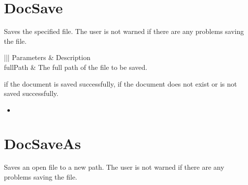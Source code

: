 \documentclass[letterpaper,12pt,english,openany,oneside]{sphinxmanual}
\begin{document}
\section{DocSave}
\label{\detokenize{IAC_API_DDE_Messages:id31}}
Saves the specified file. The user is not warned if there are any problems saving the file.


\begin{sphinxVerbatim}[commandchars=\\\{\}]
\PYG{p}{[} \PYG{p}{]}
\end{sphinxVerbatim}
\label{\detokenize{IAC_API_DDE_Messages:parameters-13}}


\begin{savenotes}\sphinxattablestart
\centering
{}\label{\detokenize{IAC_API_DDE_Messages:section-13}}\nobreak
\begin{tabular}[t]{|||}
\hline
\sphinxstyletheadfamily 
Parameters
&\sphinxstyletheadfamily 
Description
\\
\hline
fullPath
&
The full path of the file to be saved.
\\
\hline
\end{tabular}
\par
\sphinxattableend\end{savenotes}


 if the document is saved successfully,  if the document does not exist or is not saved successfully.

\label{\detokenize{IAC_API_DDE_Messages:related-methods-14}}
\begin{itemize}
\item {} 

\end{itemize}




\section{DocSaveAs}
\label{\detokenize{IAC_API_DDE_Messages:id32}}
Saves an open file to a new path. The user is not warned if there are any problems saving the file.
\end{document}
